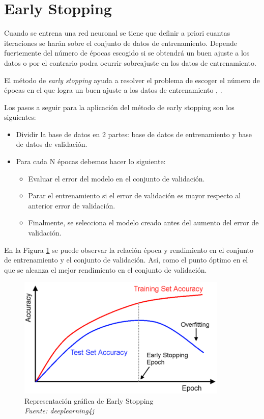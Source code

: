 \section{Early Stopping}





Cuando se entrena una red neuronal se tiene que definir a priori cuantas iteraciones se harán sobre el conjunto de datos de entrenamiento. 
Depende fuertemente del número de épocas escogido si se obtendrá un buen ajuste a los datos o por el contrario podra ocurrir sobreajuste en los datos de entrenamiento. 

El método de \textit{early stopping}  ayuda a resolver el problema de escoger el número de épocas en el que logra un buen ajuste a los datos de entrenamiento \cite{32Stopping}, \cite{prechelt1998early}.

Los pasos a seguir para la aplicación del método de early stopping son los siguientes:

\begin{itemize}
 \item Dividir la base de datos en 2 partes: base de datos de entrenamiento y base de datos de validación.
 
 \item Para cada N épocas debemos hacer lo siguiente:
   \begin{itemize}
    \item Evaluar el error del modelo en el conjunto de validación.
    \item Parar el entrenamiento si el error de validación es mayor respecto al anterior error de validación.
    \item Finalmente, se selecciona el modelo creado antes del aumento del error de validación.
   \end{itemize}
\end{itemize}

En la Figura \ref{fig:early_stopping} se puede observar la relación época y rendimiento en el conjunto de entrenamiento y el conjunto de validación. Así, como el punto óptimo en el que se alcanza el mejor rendimiento en el conjunto de validación.


\begin{figure}[!htb]
    \centering
    \includegraphics[width=100mm]{Imagenes/early_stopping.png}
    \caption{Representación gráfica de Early Stopping \\ \textit{Fuente: deeplearning4j \cite{32Stopping}}}
    \label{fig:early_stopping}
\end{figure}


